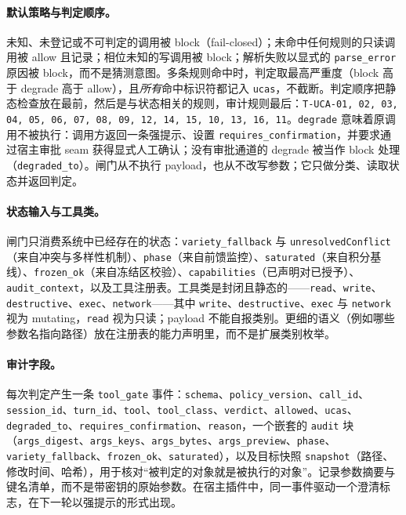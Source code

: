 \paragraph{默认策略与判定顺序。} 未知、未登记或不可判定的调用被 block（fail-closed）；未命中任何规则的只读调用被 allow 且记录；相位未知的写调用被 block；解析失败以显式的 \texttt{parse\_error} 原因被 block，而不是猜测意图。多条规则命中时，判定取最高严重度（block 高于 degrade 高于 allow），且\emph{所有}命中标识符都记入 \texttt{ucas}，不截断。判定顺序把静态检查放在最前，然后是与状态相关的规则，审计规则最后：\texttt{T-\allowbreak{}UCA-\allowbreak{}01, 02, 03, 04, 05, 06, 07, 08, 09, 12, 14, 15, 10, 13, 16, 11}。\texttt{degrade} 意味着原调用不被执行：调用方返回一条强提示、设置 \texttt{requires\_\allowbreak{}confirmation}，并要求通过宿主审批 seam 获得显式人工确认；没有审批通道的 degrade 被当作 block 处理（\texttt{degraded\_to}）。闸门从不执行 payload，也从不改写参数；它只做分类、读取状态并返回判定。

\paragraph{状态输入与工具类。} 闸门只消费系统中已经存在的状态：\texttt{variety\_fallback} 与 \texttt{unresolvedConflict}（来自冲突与多样性机制）、\texttt{phase}（来自前馈监控）、\texttt{saturated}（来自积分基线）、\texttt{frozen\_ok}（来自冻结区校验）、\texttt{capabilities}（已声明对已授予）、\texttt{audit\_context}，以及工具注册表。工具类是封闭且静态的——\texttt{read}、\texttt{write}、\texttt{destructive}、\texttt{exec}、\texttt{network}——其中 \texttt{write}、\texttt{destructive}、\texttt{exec} 与 \texttt{network} 视为 mutating，\texttt{read} 视为只读；payload 不能自报类别。更细的语义（例如哪些参数名指向路径）放在注册表的能力声明里，而不是扩展类别枚举。

\paragraph{审计字段。} 每次判定产生一条 \texttt{tool\_gate} 事件：\texttt{schema}、\texttt{policy\_version}、\texttt{call\_id}、\texttt{session\_id}、\texttt{turn\_id}、\texttt{tool}、\texttt{tool\_class}、\texttt{verdict}、\texttt{allowed}、\texttt{ucas}、\texttt{degraded\_to}、\texttt{requires\_\allowbreak{}confirmation}、\texttt{reason}，一个嵌套的 \texttt{audit} 块（\texttt{args\_digest}、\texttt{args\_keys}、\texttt{args\_bytes}、\texttt{args\_preview}、\texttt{phase}、\texttt{variety\_fallback}、\texttt{frozen\_ok}、\texttt{saturated}），以及目标快照 \texttt{snapshot}（路径、修改时间、哈希），用于核对“被判定的对象就是被执行的对象”。记录参数摘要与键名清单，而不是带密钥的原始参数。在宿主插件中，同一事件驱动一个澄清标志，在下一轮以强提示的形式出现。

